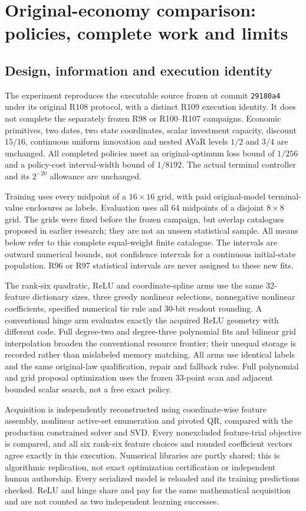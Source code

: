 \section{Original-economy comparison: policies, complete work and limits}\label{sec:study109}
\subsection{Design, information and execution identity}
The experiment reproduces the executable source frozen at commit \texttt{29180a4} under its original R108 protocol, with a distinct R109 execution identity. It does not complete the separately frozen R98 or R100--R107 campaigns. Economic primitives, two dates, two state coordinates, scalar investment capacity, discount $15/16$, continuous uniform innovation and nested AVaR levels $1/2$ and $3/4$ are unchanged. All completed policies meet an original-optimum loss bound of $1/256$ and a policy-cost interval-width bound of $1/8192$. The actual terminal controller and its $2^{-20}$ allowance are unchanged.

Training uses every midpoint of a $16\times16$ grid, with paid original-model terminal-value enclosures as labels. Evaluation uses all 64 midpoints of a disjoint $8\times8$ grid. The grids were fixed before the frozen campaign, but overlap catalogues proposed in earlier research; they are not an unseen statistical sample. All means below refer to this complete equal-weight finite catalogue. The intervals are outward numerical bounds, not confidence intervals for a continuous initial-state population. R96 or R97 statistical intervals are never assigned to these new fits.

The rank-six quadratic, ReLU and coordinate-spline arms use the same 32-feature dictionary sizes, three greedy nonlinear selections, nonnegative nonlinear coefficients, specified numerical tie rule and 30-bit readout rounding. A conventional hinge arm evaluates exactly the acquired ReLU geometry with different code. Full degree-two and degree-three polynomial fits and bilinear grid interpolation broaden the conventional resource frontier; their unequal storage is recorded rather than mislabeled memory matching. All arms use identical labels and the same original-law qualification, repair and fallback rules. Full polynomial and grid proposal optimization uses the frozen 33-point scan and adjacent bounded scalar search, not a free exact policy.

Acquisition is independently reconstructed using coordinate-wise feature assembly, nonlinear active-set enumeration and pivoted QR, compared with the production constrained solver and SVD. Every nonexcluded feature-trial objective is compared, and all six rank-six feature choices and rounded coefficient vectors agree exactly in this execution. Numerical libraries are partly shared; this is algorithmic replication, not exact optimization certification or independent human authorship. Every serialized model is reloaded and its training predictions checked. ReLU and hinge share and pay for the same mathematical acquisition and are not counted as two independent learning successes.

